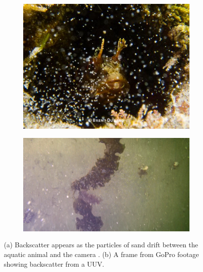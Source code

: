 \begin{figure}[H]
    \centering
    \begin{subfigure}{.49\textwidth}
        \centering
        \includegraphics[width=1\linewidth]{assets/backscatter_article_durand2.jpg}
        \caption{}
    \end{subfigure}
    \hfill
    \begin{subfigure}{.49\textwidth}
        \centering
        \includegraphics[width=1\linewidth]{assets/backscatter_test_vid.png}
        \caption{}
    \end{subfigure}
    \caption{(a) Backscatter appears as the particles of sand drift between the aquatic animal and the camera \cite{brentdurandEasyWaysEliminate2013}. (b) A frame from GoPro footage showing backscatter from a UUV.}
    \label{fig:backscatter}
\end{figure}

